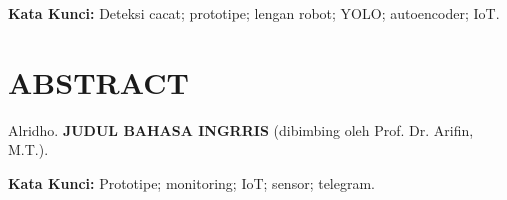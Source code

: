 \vspace*{0.1cm}

\noindent
\textbf{Kata Kunci:} Deteksi cacat; prototipe; lengan robot; YOLO; autoencoder; IoT.

\endgroup

\newpage

\begingroup
\singlespacing
\chapter*{ABSTRACT}

\noindent
Alridho. \textbf{JUDUL BAHASA INGRRIS} (dibimbing oleh Prof. Dr. Arifin, M.T.). \par

\vspace*{0.1cm}
 
\noindent
\lipsum[1]


\vspace*{0.1cm}

\noindent
\textbf{Kata Kunci:} Prototipe; monitoring; IoT; sensor; telegram.

\endgroup

